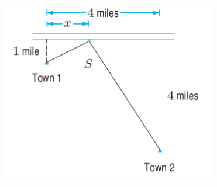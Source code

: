 \documentclass[12pt]{article}
\begin{document}
\begin{figure}[h!]
\begin{center}
\vspace{-1mm}
\includegraphics[width=3.7in]{towns.png}
\vspace{-2mm}
\label{fig:towns}
\vspace{-15mm}
\end{center}
\end{figure}
\end{document}
